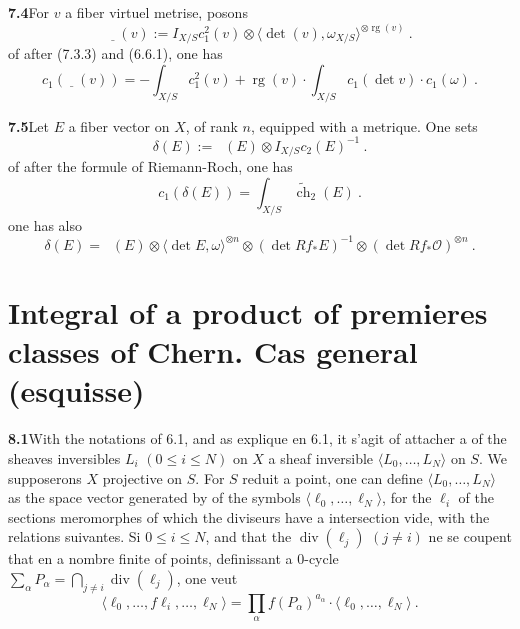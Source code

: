 \documentclass[12pt,a4paper]{article}
\theoremstyle{plain}
\theoremstyle{definition}
\theoremstyle{remark}
\DeclareMathOperator{\rank}{rg}
\DeclareMathOperator{\ch}{ch}
\DeclareMathOperator{\divm}{div}
\newcommand{\calO}{\mathcal{O}}
\DeclareMathOperator{\ICtwo}{IC_2}
\newcommand{\wch}{\widetilde{\ch}}
\begin{document}
\medskip
\noindent\textbf{7.4}\quad For $v$ a fiber virtuel metrise, posons
\begin{equation}
\label{eq:7.4.1}
\underline{\ICtwo}(v) := I_{X/S} c_1^2(v) \otimes \langle \det(v), \omega_{X/S} \rangle^{\otimes \rank(v)} \ .
\end{equation}
of after (7.3.3) and (6.6.1), one has
\begin{equation}
\label{eq:7.4.2}
c_1(\underline{\ICtwo}(v)) = -\int_{X/S} c_1^2(v) + \rank(v) \cdot \int_{X/S} c_1(\det v) \cdot c_1(\omega) \ .
\end{equation}

\medskip
\noindent\textbf{7.5}\quad Let $E$ a fiber vector on $X$, of rank $n$, equipped with a metrique. One sets
\begin{equation}
\label{eq:7.5.1}
\delta(E) := \ICtwo(E) \otimes I_{X/S} c_2(E)^{-1} \ .
\end{equation}
of after the formule of Riemann-Roch, one has
\begin{equation}
\label{eq:7.5.2}
c_1(\delta(E)) = \int_{X/S} \wch_2(E) \ .
\end{equation}
one has also
\begin{equation}
\label{eq:7.5.3}
\delta(E) = \ICtwo(E) \otimes \langle \det E, \omega \rangle^{\otimes n} \otimes (\det Rf_* E)^{-1} \otimes (\det Rf_* \calO)^{\otimes n} \ .
\end{equation}


\section{Integral of a product of premieres classes of Chern. Cas general (esquisse)}

\noindent\textbf{8.1}\quad With the notations of 6.1, and as explique en 6.1, it s'agit of attacher a of the sheaves inversibles $L_i$ $(0 \leq i \leq N)$ on $X$ a sheaf inversible $\langle L_0, \ldots, L_N \rangle$ on $S$. We supposerons $X$ projective on $S$. For $S$ reduit a point, one can define $\langle L_0, \ldots, L_N \rangle$ as the space vector generated by of the symbols $\langle \ell_0, \ldots, \ell_N \rangle$, for the $\ell_i$ of the sections meromorphes of which the diviseurs have a intersection vide, with the relations suivantes. Si $0 \leq i \leq N$, and that the $\divm(\ell_j)$ $(j \neq i)$ ne se coupent that en a nombre finite of points, definissant a 0-cycle $\sum_\alpha P_\alpha = \bigcap_{j \neq i} \divm(\ell_j)$, one veut
\begin{equation}
\label{eq:8.1.1}
\langle \ell_0, \ldots, f\ell_i, \ldots, \ell_N \rangle = \textstyle\prod_\alpha f(P_\alpha)^{a_\alpha} \cdot \langle \ell_0, \ldots, \ell_N \rangle \ .
\end{equation}
\end{document}
